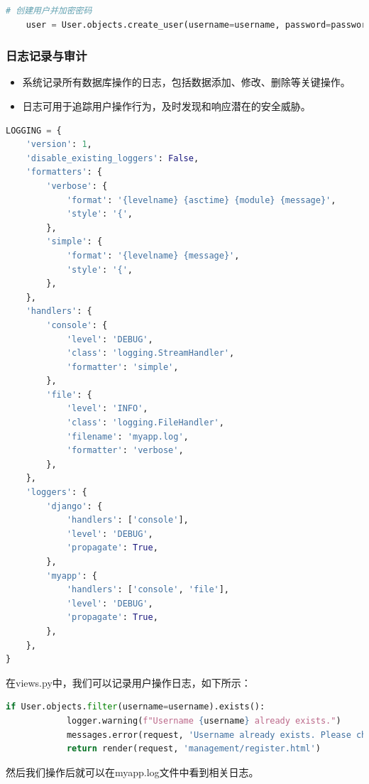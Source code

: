\documentclass[UTF8,a4paper,12pt]{ctexart}
\begin{document}
\begin{lstlisting}[language=python]
    # 创建用户并加密密码
    user = User.objects.create_user(username=username, password=password)
\end{lstlisting}

\subsubsection{日志记录与审计}
\begin{itemize}
    \item 系统记录所有数据库操作的日志，包括数据添加、修改、删除等关键操作。
    \item 日志可用于追踪用户操作行为，及时发现和响应潜在的安全威胁。
\end{itemize}

\begin{lstlisting}[language=python]
    LOGGING = {
    'version': 1,
    'disable_existing_loggers': False,
    'formatters': {
        'verbose': {
            'format': '{levelname} {asctime} {module} {message}',
            'style': '{',
        },
        'simple': {
            'format': '{levelname} {message}',
            'style': '{',
        },
    },
    'handlers': {
        'console': {
            'level': 'DEBUG',
            'class': 'logging.StreamHandler',
            'formatter': 'simple',
        },
        'file': {
            'level': 'INFO',
            'class': 'logging.FileHandler',
            'filename': 'myapp.log',
            'formatter': 'verbose',
        },
    },
    'loggers': {
        'django': {
            'handlers': ['console'],
            'level': 'DEBUG',
            'propagate': True,
        },
        'myapp': {
            'handlers': ['console', 'file'],
            'level': 'DEBUG',
            'propagate': True,
        },
    },
}
\end{lstlisting}

在views.py中，我们可以记录用户操作日志，如下所示：

\begin{lstlisting}[language=python]
    if User.objects.filter(username=username).exists():
            logger.warning(f"Username {username} already exists.")
            messages.error(request, 'Username already exists. Please choose another one.')
            return render(request, 'management/register.html')
\end{lstlisting}

然后我们操作后就可以在myapp.log文件中看到相关日志。
\end{document}
